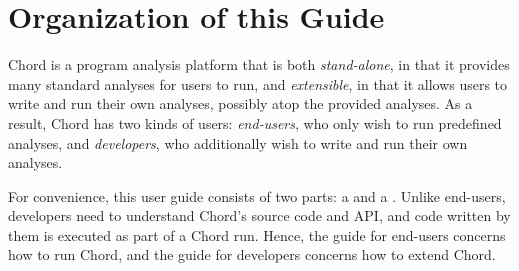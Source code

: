 \chapter{Organization of this Guide}
\label{chap:organization}

Chord is a program analysis platform that is both {\it stand-alone}, in that it
provides many standard analyses for users to run, and {\it extensible}, in that
it allows users to write and run their own analyses, possibly atop the provided
analyses.  As a result, Chord has two kinds of users: {\it end-users}, who only
wish to run predefined analyses, and {\it developers}, who additionally wish to
write and run their own analyses.

For convenience, this user guide consists of two parts: a
 and a
.  Unlike end-users,
developers need to understand Chord's source code and API, and code written by
them is executed as part of a Chord run.  Hence, the guide for end-users
concerns how to run Chord, and the guide for developers concerns how to extend
Chord.

